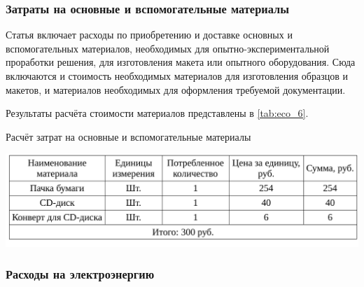 \subsubsection{Затраты на основные и вспомогательные материалы}

Статья включает расходы по приобретению и доставке основных и вспомогательных материалов, необходимых для опытно-экспериментальной проработки 
решения, для изготовления макета или опытного оборудования. Сюда включаются и стоимость необходимых материалов для изготовления образцов и 
макетов, и материалов необходимых для оформления требуемой документации.

Результаты расчёта стоимости материалов представлены в \ref{tab:eco_6}.

\begin{table}[!ht]
\caption{Расчёт затрат на основные и вспомогательные материалы}
\centering
\includegraphics[page=1, width=1\linewidth]{tables/economics/econom.pdf}
\label{tab:eco_6}
\end{table}



\subsubsection{Расходы на электроэнергию}

